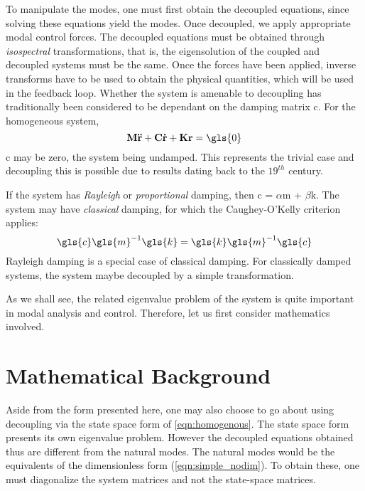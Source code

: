 To manipulate the modes, one must first obtain the decoupled equations, since
solving these equations yield the modes. Once decoupled, we apply appropriate
modal control forces. The decoupled equations must be obtained through 
\emph{isospectral} transformations, that is, the eigensolution of the coupled
and decoupled systems must be the same. Once the forces have been applied,
inverse transforms have to be used to obtain the physical quantities, which will
be used in the feedback loop. Whether the system is amenable to decoupling has
traditionally been considered to be dependant on the damping matrix \gls{c}.
For the homogeneous system,
\begin{equation}
	\mathbf{M\ddot{r} + C\dot{r} + Kr} = \gls{0} \label{eqn:homogenous}
\end{equation}
\gls{c} may be zero, the system being undamped. This represents the trivial 
case and decoupling this is possible due to results dating back to the $19^{th}$
century.

If the system has \emph{Rayleigh} or \emph{proportional} damping, then 
\gls{c} = $\alpha$\gls{m} + $\beta$\gls{k}. The system may have 
\emph{classical} damping, for which the Caughey-O'Kelly criterion \citep{caughey:583}
applies: 
\[ \gls{c}\gls{m}^{-1}\gls{k} = \gls{k}\gls{m}^{-1}\gls{c} \]
Rayleigh damping is a special case of classical damping. For classically damped
systems, the system maybe decoupled by a simple transformation.

As we shall see, the related eigenvalue problem of the system is quite important in 
modal analysis and control. Therefore, let us first consider mathematics involved.

\section{Mathematical Background}
\label{sec:intro_math}
Aside from the form presented here, one may also choose to go about using decoupling
via the state space form of \autoref{eqn:homogenous}. The state space form
presents its own eigenvalue problem. However the decoupled equations obtained thus 
are different from the natural modes. The natural modes would be the equivalents of 
the dimensionless form (\autoref{eqn:simple_nodim}). To obtain these, one must diagonalize 
the system matrices and not the state-space matrices.

